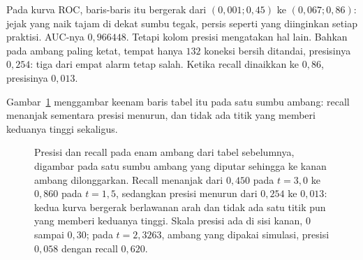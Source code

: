 Pada kurva ROC, baris-baris itu bergerak dari $(0{,}001;0{,}45)$ ke $(0{,}067;0{,}86)$:
jejak yang naik tajam di dekat sumbu tegak, persis seperti yang diinginkan setiap
praktisi. AUC-nya $0{,}966448$. Tetapi kolom presisi mengatakan hal lain. Bahkan pada
ambang paling ketat, tempat hanya $132$ koneksi bersih ditandai, presisinya $0{,}254$:
tiga dari empat alarm tetap salah. Ketika recall dinaikkan ke $0{,}86$, presisinya
$0{,}013$.

Gambar~\ref{fig:presisi-recall-ambang} menggambar keenam baris tabel itu pada satu sumbu
ambang: recall menanjak sementara presisi menurun, dan tidak ada titik yang memberi keduanya
tinggi sekaligus.

\begin{figure}[htbp]
\centering
{}
\caption{Presisi dan recall pada enam ambang dari tabel sebelumnya, digambar pada satu
sumbu ambang yang diputar sehingga ke kanan ambang dilonggarkan. Recall menanjak dari
$0{,}450$ pada $t=3{,}0$ ke $0{,}860$ pada $t=1{,}5$, sedangkan presisi menurun dari
$0{,}254$ ke $0{,}013$: kedua kurva bergerak berlawanan arah dan tidak ada satu titik pun
yang memberi keduanya tinggi. Skala presisi ada di sisi kanan, $0$ sampai $0{,}30$; pada
$t=2{,}3263$, ambang yang dipakai simulasi, presisi $0{,}058$ dengan recall $0{,}620$.}
\label{fig:presisi-recall-ambang}
\end{figure}

